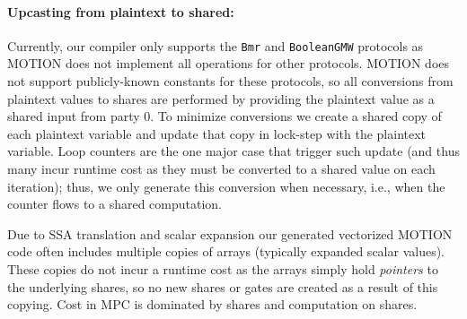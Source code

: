 \paragraph{Upcasting from plaintext to shared:}
Currently, our compiler only supports the \texttt{Bmr} and \texttt{BooleanGMW} protocols as MOTION does not implement all operations for other protocols.  MOTION does not support publicly-known constants for these protocols, so all conversions from plaintext values to shares are performed by providing the plaintext value as a shared input from party 0. %
To minimize conversions we create a shared copy of each plaintext variable and update that copy in lock-step with the plaintext variable.  %
Loop counters are the one major case that trigger such update (and thus many incur runtime cost as they must be converted to a shared value on each iteration); thus, we only generate this conversion when necessary, i.e., when the counter flows to a shared computation. %

Due to SSA translation and scalar expansion our generated vectorized MOTION code often includes multiple copies of arrays (typically expanded scalar values). These copies do not incur a runtime cost as the arrays simply hold \emph{pointers} to the underlying shares, so no new shares or gates are created as a result of this copying. Cost in MPC is dominated by shares and computation on shares. %
